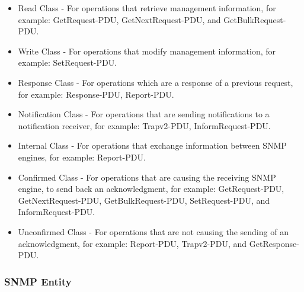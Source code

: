 \begin{minipage}{\textwidth}
\begin{itemize}
    \item Read Class - For operations that retrieve management information, for example: GetRequest-PDU, GetNextRequest-PDU, and GetBulkRequest-PDU.
    \item Write Class - For operations that modify management information, for example: SetRequest-PDU.
    \item Response Class - For operations which are a response of a previous request, for example: Response-PDU, Report-PDU.
    \item Notification Class - For operations that are sending notifications to a notification receiver, for example: Trapv2-PDU, InformRequest-PDU.
    \item Internal Class - For operations that exchange information between SNMP engines, for example: Report-PDU.
    \item Confirmed Class - For operations that are causing the receiving SNMP engine, to send back an acknowledgment, for example: GetRequest-PDU, GetNextRequest-PDU, GetBulkRequest-PDU, SetRequest-PDU, and InformRequest-PDU.
    \item Unconfirmed Class - For operations that are not causing the sending of an acknowledgment, for example: Report-PDU, Trapv2-PDU, and GetResponse-PDU.
\end{itemize}
\end{minipage}


\subsubsection{SNMP Entity}
\label{Section:SNMP-Entity}

